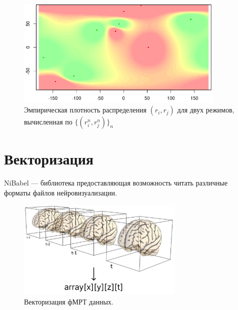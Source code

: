 \documentclass{beamer}
\begin{document}
	\begin{frame} 
		\vspace{0.4cm}
		
		\begin{figure}
			\includegraphics[width=10cm]{../images/classification.png}
			\caption{Эмпирическая плотность распределения $(r_i, r_j)$ для двух режимов, вычисленная по $\{(r_i^n, r_j^n)\}_n$} 
			\label{fg:4}
		\end{figure}
	\end{frame}

	\section{Векторизация}
	\begin{frame} 		
		NiBabel --- библиотека предоставляющая возможность читать различные форматы файлов нейровизуализации.
		\vspace{0.8cm}
		
		\begin{figure}
			\includegraphics[width=8cm]{../images/vectorization_2.pdf}
			\caption{Векторизация фМРТ данных.} 
			\label{fg:5}
		\end{figure}
	\end{frame}
\end{document}
